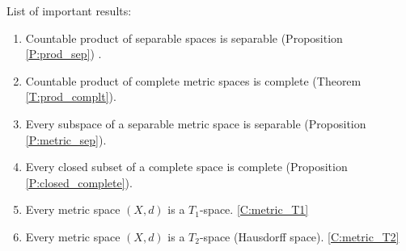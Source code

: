 \newpage
List of important results:
\begin{enumerate}
  \item Countable product of separable spaces is separable (Proposition
	\ref{P:prod_sep}) .
  \item	Countable product of complete metric spaces is complete (Theorem 
	\ref{T:prod_complt}).
  \item Every subspace of a separable metric space is separable (Proposition
	\ref{P:metric_sep}).
  \item Every closed subset of a complete space is complete (Proposition
	\ref{P:closed_complete}).
  \item Every metric space $(X,d)$ is a $T_1$-space. 
        \ref{C:metric_T1}
  \item Every metric space $(X,d)$ is a $T_2$-space (Hausdorff space). 
        \ref{C:metric_T2}
\end{enumerate}



